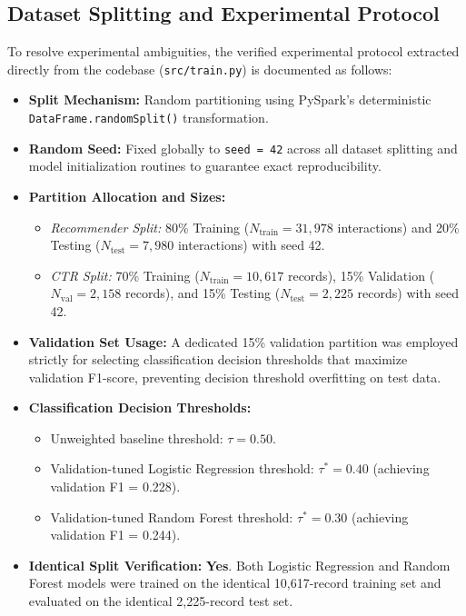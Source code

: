 \documentclass[10pt,a4paper,twoside]{article}
\begin{document}
\subsection{Dataset Splitting and Experimental Protocol}
To resolve experimental ambiguities, the verified experimental protocol extracted directly from the codebase (\texttt{src/train.py}) is documented as follows:
\begin{itemize}
    \item \textbf{Split Mechanism:} Random partitioning using PySpark's deterministic \texttt{DataFrame.randomSplit()} transformation.
    \item \textbf{Random Seed:} Fixed globally to \texttt{seed = 42} across all dataset splitting and model initialization routines to guarantee exact reproducibility.
    \item \textbf{Partition Allocation and Sizes:}
    \begin{itemize}
        \item \emph{Recommender Split:} 80\% Training ($N_{\text{train}} = 31,978$ interactions) and 20\% Testing ($N_{\text{test}} = 7,980$ interactions) with seed 42.
        \item \emph{CTR Split:} 70\% Training ($N_{\text{train}} = 10,617$ records), 15\% Validation ($N_{\text{val}} = 2,158$ records), and 15\% Testing ($N_{\text{test}} = 2,225$ records) with seed 42.
    \end{itemize}
    \item \textbf{Validation Set Usage:} A dedicated 15\% validation partition was employed strictly for selecting classification decision thresholds that maximize validation F1-score, preventing decision threshold overfitting on test data.
    \item \textbf{Classification Decision Thresholds:} 
    \begin{itemize}
        \item Unweighted baseline threshold: $\tau = 0.50$.
        \item Validation-tuned Logistic Regression threshold: $\tau^* = 0.40$ (achieving validation F1 = 0.228).
        \item Validation-tuned Random Forest threshold: $\tau^* = 0.30$ (achieving validation F1 = 0.244).
    \end{itemize}
    \item \textbf{Identical Split Verification:} \textbf{Yes}. Both Logistic Regression and Random Forest models were trained on the identical 10,617-record training set and evaluated on the identical 2,225-record test set.
\end{itemize}
\end{document}
